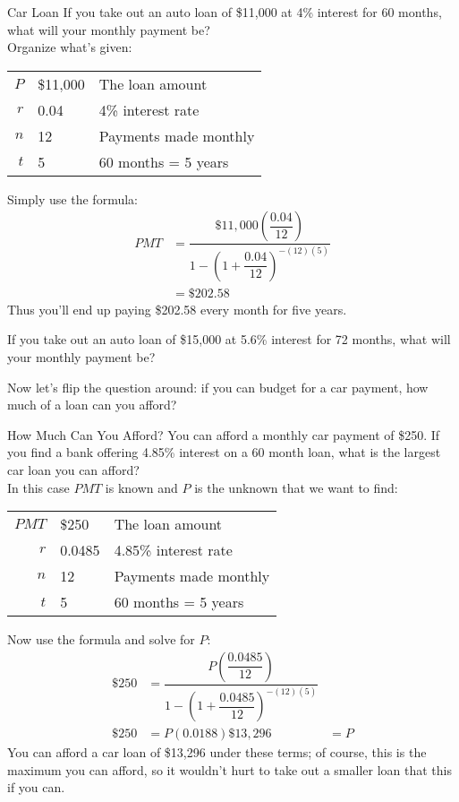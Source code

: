\begin{example}[https://www.youtube.com/watch?v=RVUWTbil3fQ]{Car Loan}
If you take out an auto loan of \$11,000 at 4\% interest for 60 months, what will your monthly payment be?\\

Organize what's given:
\begin{center}
\begin{tabular}{r l l}
$P$ & \$11,000 & The loan amount\\
$r$ & 0.04 & 4\% interest rate\\
$n$ & 12 & Payments made monthly\\
$t$ & 5 & 60 months = 5 years
\end{tabular}
\end{center}

Simply use the formula:
\begin{align*}
PMT &= \dfrac{\$11,000\left(\dfrac{0.04}{12}\right)}{1-\left(1+\dfrac{0.04}{12}\right)^{-(12)(5)}}\\
&= \$202.58
\end{align*}
Thus you'll end up paying \$202.58 every month for five years.
\end{example}

\begin{try}
If you take out an auto loan of \$15,000 at 5.6\% interest for 72 months, what will your monthly payment be?
\end{try}

Now let's flip the question around: if you can budget for a car payment, how much of a loan can you afford?
\vfill
\pagebreak

\begin{example}[https://www.youtube.com/watch?v=ydmN5lt5g20]{How Much Can You Afford?}
You can afford a monthly car payment of \$250.  If you find a bank offering 4.85\% interest on a 60 month loan, what is the largest car loan you can afford?\\

In this case $PMT$ is known and $P$ is the unknown that we want to find:
\begin{center}
\begin{tabular}{r l l}
$PMT$ & \$250 & The loan amount\\
$r$ & 0.0485 & 4.85\% interest rate\\
$n$ & 12 & Payments made monthly\\
$t$ & 5 & 60 months = 5 years
\end{tabular}
\end{center}

Now use the formula and solve for $P$:
\begin{align*}
\$250 &= \dfrac{P\left(\dfrac{0.0485}{12}\right)}{1-\left(1+\dfrac{0.0485}{12}\right)^{-(12)(5)}}\\
\$250 &= P(0.0188)
\$13,296 &= P
\end{align*}
You can afford a car loan of \$13,296 under these terms; of course, this is the maximum you can afford, so it wouldn't hurt to take out a smaller loan that this if you can.
\end{example}

